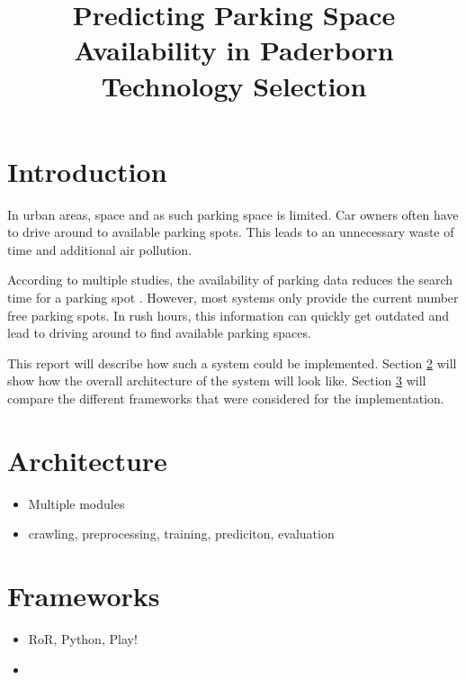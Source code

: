 



\title{Predicting Parking Space Availability in Paderborn\\
Technology Selection}
\maketitle


\section{Introduction}

In urban areas, space and as such parking space is limited. Car owners often have to drive around to available parking spots. This leads to an unnecessary waste of time and additional air pollution. 

According to multiple studies, the availability of parking data reduces the search time for a parking spot \cite{Asakura1994}\cite{Caicedo2010228}. However, most systems only provide the current number free parking spots. In rush hours, this information can quickly get outdated and lead to driving around to find available parking spaces.

This report will describe how such a system could be implemented. Section \ref{sec:architecture} will show how the overall architecture of the system will look like. Section \ref{sec:frameworks} will compare the different frameworks that were considered for the implementation. 


\section{Architecture}\label{sec:architecture}
\begin{itemize}
  \item Multiple modules
  \item crawling, preprocessing, training, prediciton, evaluation
\end{itemize}

\section{Frameworks}\label{sec:frameworks}

\begin{itemize}
  \item RoR, Python, Play!
  \item 
\end{itemize}


  



